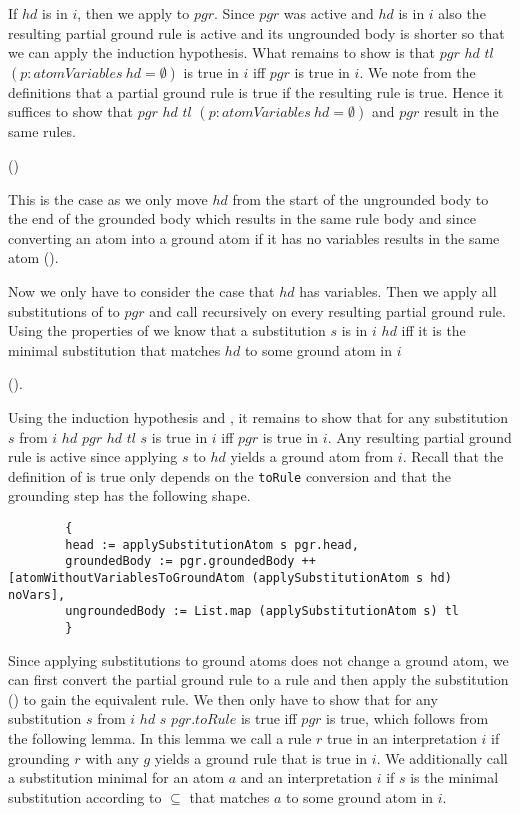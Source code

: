     If $hd$ is in $i$, then we apply \moveAtomWithoutVariables to $pgr$. Since $pgr$ was active and $hd$ is in $i$ also the resulting partial ground rule is active and its ungrounded body is shorter so that we can apply the induction hypothesis. What remains to show is that \moveAtomWithoutVariables $pgr$ $hd$ $tl$ $(p: atomVariables\ hd = \emptyset)$ is true in $i$ iff $pgr$ is true in $i$. We note from the definitions that a partial ground rule is true if the resulting rule is true. Hence it suffices to show that \moveAtomWithoutVariables $pgr$ $hd$ $tl$ $(p: atomVariables\ hd = \emptyset)$ and $pgr$ result in the same rules.
    
    (\partialGroundRuleisTrueofequaltoRule)
    
    This is the case as we only move $hd$ from the start of the ungrounded body to the end of the grounded body which results in the same rule body and since converting an atom into a ground atom if it has no variables results in the same atom (\groundAtomToAtomOfAtomWithoutVariablesToGroundAtomIsSelf).

    Now we only have to consider the case that $hd$ has variables. Then we apply all substitutions of \getSubstitutions to $pgr$ and call \exploreGrounding recursively on every resulting partial ground rule. Using the properties of \matchAtom we know that a substitution $s$ is in \getSubstitutions $i$ $hd$ iff it is the minimal substitution that matches $hd$ to some ground atom in $i$ 
    
    (\inGetSubstitutionsIffMinimalSolutionAndInInterpretation).

    Using the induction hypothesis and \ListmapexceptunitIsUnitIffAll, it remains to show that for any substitution $s$ from \getSubstitutions $i$ $hd$ \groundingStep $pgr$ $hd$ $tl$ $s$ is true in $i$ iff $pgr$ is true in $i$. Any resulting partial ground rule is active since applying $s$ to $hd$ yields a ground atom from $i$. Recall that the definition of is true only depends on the \lstinline|toRule| conversion and that the grounding step has the following shape.

    \begin{lstlisting}
        {
        head := applySubstitutionAtom s pgr.head,
        groundedBody := pgr.groundedBody ++ [atomWithoutVariablesToGroundAtom (applySubstitutionAtom s hd) noVars],
        ungroundedBody := List.map (applySubstitutionAtom s) tl
        }
    \end{lstlisting}

    Since applying substitutions to ground atoms does not change a ground atom, we can first convert the partial ground rule to a rule and then apply the substitution (\swapPgrApplySubstitution) to gain the equivalent rule. We then only have to show that for any substitution $s$ from \getSubstitutions $i$ $hd$ \applySubstitutionRule $s$ $pgr.toRule$ is true iff $pgr$ is true, which follows from the following lemma. In this lemma we call a rule $r$ true in an interpretation $i$ if grounding $r$ with any $g$ yields a ground rule that is true in $i$. We additionally call a substitution minimal for an atom $a$ and an interpretation $i$ if $s$ is the minimal substitution according to $\subseteq$ that matches $a$ to some ground atom in $i$.

